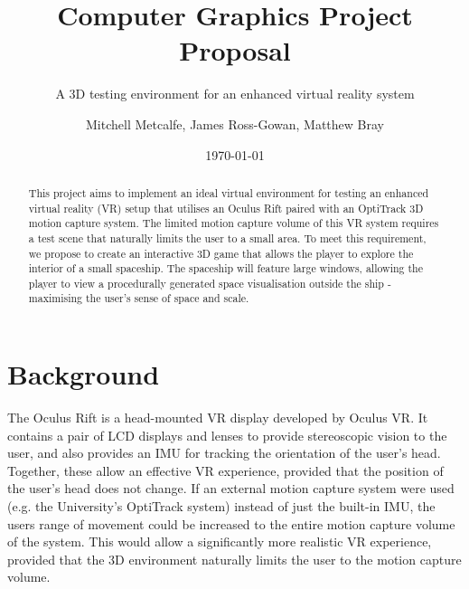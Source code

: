 \documentclass[11pt]{scrartcl} %
\title{Computer Graphics Project Proposal}
\subtitle{A 3D testing environment for an enhanced virtual reality system}
\author{Mitchell Metcalfe, James Ross-Gowan, Matthew Bray }
\date{\today} %
\begin{document}
\maketitle

\begin{abstract}

    This project aims to implement an ideal virtual environment for testing an
    enhanced virtual reality (VR) setup that utilises an Oculus Rift
    paired with an OptiTrack 3D motion capture system.
    The limited motion capture volume of this VR system requires a test scene
    that naturally limits the user to a small area.
    To meet this requirement, we propose to create an interactive 3D game that
    allows the player to explore the interior of a small spaceship. The
    spaceship will feature large windows, allowing the player to view a
    procedurally generated space visualisation outside the ship - maximising
    the user's sense of space and scale.

\end{abstract}







\section*{Background}

    The Oculus Rift is a head-mounted VR display developed by Oculus VR. It
    contains a pair of LCD displays and lenses to provide stereoscopic vision
    to the user, and also provides an IMU for tracking the orientation of the
    user's head. Together, these allow an effective VR experience, provided
    that the position of the user's head does not change. If an external motion
    capture system were used (e.g. the University's OptiTrack system) instead
    of just the built-in IMU, the users range of movement could be increased to
    the entire motion capture volume of the system. This would allow a
    significantly more realistic VR experience, provided that the 3D
    environment naturally limits the user to the motion capture volume.
\end{document}
